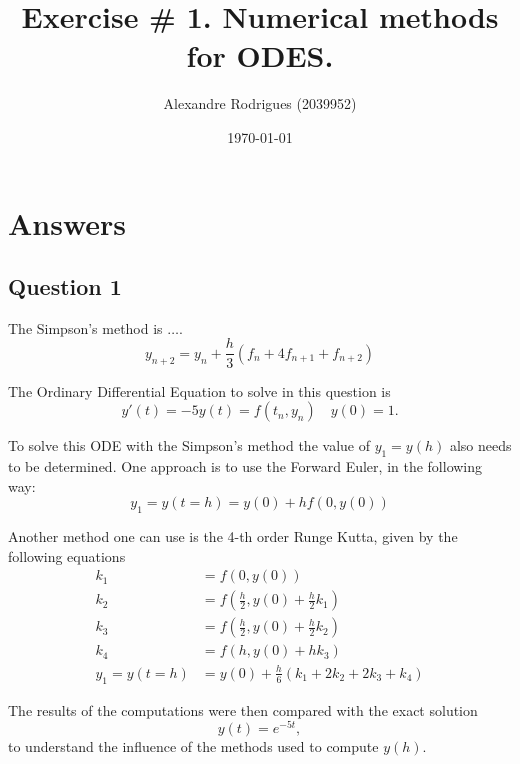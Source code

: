 \documentclass[a4paper, 11pt]{article}
\begin{document}
	
	\title{Exercise \# 1. Numerical methods for ODES. }
	\author{{\small Alexandre Rodrigues (2039952)}}
	\date{\today}
	
	\maketitle
	
	\section*{Answers}
		\subsection*{Question 1}
		The Simpson's method is $\ldots$.
		\begin{equation}
			y_{n+2} = y_n + \frac{h}{3}\left( f_n + 4 f_{n+1} + f_{n+2} \right)
		\end{equation}

		The Ordinary Differential Equation to solve in this question is 
		\begin{equation}
			y'(t) = -5y(t) = f(t_n,y_n)	\quad y(0) =1.
		\end{equation}
		
		To solve this ODE with the Simpson's method the value of $ y_1 = y(h) $ also needs to be determined.
		One approach is to use the Forward Euler, in the following way:
		\begin{equation}
			y_1 = y(t = h) = y(0) + h f(0,y(0))
		\end{equation}
	
		Another method one can use is the 4-th order Runge Kutta, given by the following equations
		\begin{align}
			k_1 &= f(0,y(0)) \\
			k_2 &= f\left(\frac{h}{2},y(0) + \frac{h}{2}k_1\right) \\
			k_3 &= f\left(\frac{h}{2},y(0) + \frac{h}{2}k_2\right)\\
			k_4 &= f\left(h,y(0) + hk_3\right) \\
			y_1 = y(t = h) &= y(0) + \frac{h}{6} \left(k_1 + 2k_2 + 2k_3 + k_4 \right)
		\end{align}
		
		
		The results of the computations were then compared with the exact solution
		\begin{equation}
			y(t) = e^{-5t},
		\end{equation}
		to understand the influence of the methods used to compute $y(h)$.
		
\end{document}
